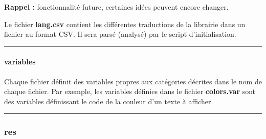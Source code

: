 \documentclass[a4paper,10pt]{article}
\begin{document}
\textbf{Rappel :} fonctionnalité future, certaines idées peuvent encore changer.

\begin{justify}
    Le fichier \textbf{\color{path}lang.csv} contient les différentes traductions de la librairie dans un fichier au format CSV. Il sera parsé (analysé) par le script d'initialisation.
\end{justify}


\par\noindent\rule{\textwidth}{0.4pt}

\paragraph{variables}\mbox{}

\begin{justify}
    Chaque fichier définit des variables propres aux catégories décrites dans le nom de chaque fichier. Par exemple, les variables définies dans le fichier \textbf{\color{path}colors.var} sont des variables définissant le code de la couleur d'un texte à afficher.
\end{justify}



\color{sec3}\par\noindent\rule{\textwidth}{0.4pt}\color{text}

\color{sec3}
\subsubsection{res}\color{text}
\end{document}
